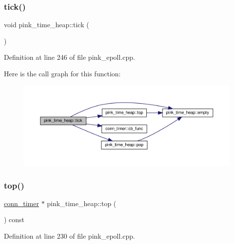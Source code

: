 \subsubsection{\texorpdfstring{tick()}{tick()}}
{\footnotesize\ttfamily void pink\+\_\+time\+\_\+heap\+::tick (\begin{DoxyParamCaption}{ }\end{DoxyParamCaption})}



Definition at line 246 of file pink\+\_\+epoll.\+cpp.

Here is the call graph for this function\+:\nopagebreak
\begin{figure}[H]
\begin{center}
\leavevmode
\includegraphics[width=350pt]{classpink__time__heap_a9193dc948c6bb00005bf6639f2169b57_cgraph}
\end{center}
\end{figure}
\mbox{\label{classpink__time__heap_ac0932b13390241373290a321ecf16600}} 
\subsubsection{\texorpdfstring{top()}{top()}}
{\footnotesize\ttfamily \hyperlink{classconn__timer}{conn\+\_\+timer} $\ast$ pink\+\_\+time\+\_\+heap\+::top (\begin{DoxyParamCaption}{ }\end{DoxyParamCaption}) const}



Definition at line 230 of file pink\+\_\+epoll.\+cpp.

